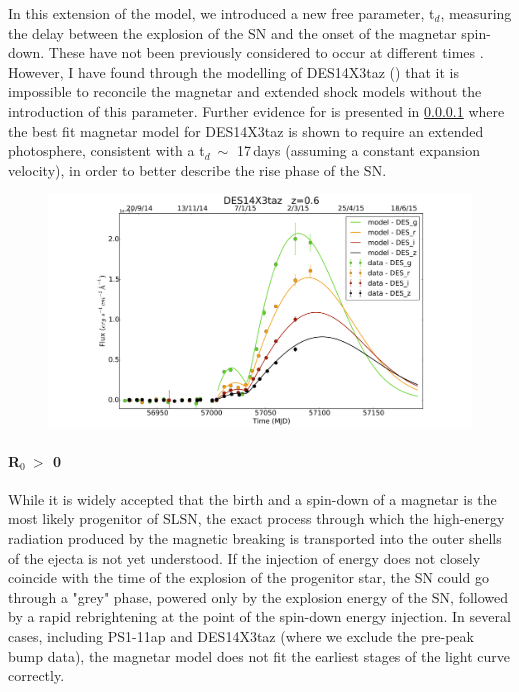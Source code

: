 In this extension of the model, we introduced a new free parameter, t$_d$, measuring the delay between the explosion of the SN and the onset of the magnetar spin-down. These have not been previously considered to occur at different times \citep{Nicoll2016}. However, I have found through the modelling of DES14X3taz () that it is impossible to reconcile the magnetar and extended shock models without the introduction of this parameter. Further evidence for is presented in \cref{par:R0nonzero} where the best fit magnetar model for DES14X3taz is shown to require an extended photosphere, consistent with a t$_d ~\sim$ 17\,days (assuming a constant expansion velocity), in order to better describe the rise phase of the SN.

\begin{figure}
  \includegraphics{Figures/Chapter4/DES14X3taz.png}
  \caption{}
  \label{fig:PiroMagnetar}
\end{figure}

\paragraph{R$_0~>$ 0}
\label{par:R0nonzero}
While it is widely accepted that the birth and a spin-down of a magnetar is the most likely progenitor of SLSN, the exact process through which the high-energy radiation produced by the magnetic breaking is transported into the outer shells of the ejecta is not yet understood. If the injection of energy does not closely coincide with the time of the explosion of the progenitor star, the SN could go through a "grey" phase, powered only by the explosion energy of the SN, followed by a rapid rebrightening at the point of the spin-down energy injection. In several cases, including PS1-11ap and DES14X3taz (where we exclude the pre-peak bump data), the magnetar model does not fit the earliest stages of the light curve correctly.


